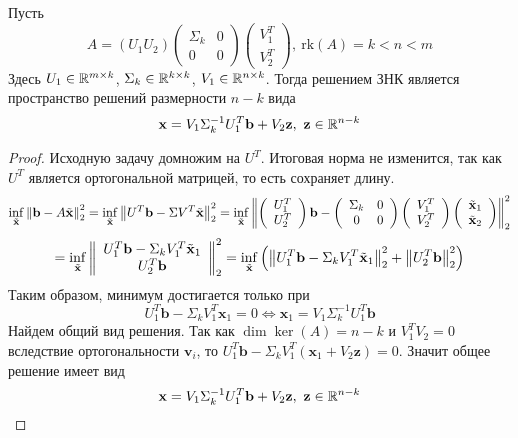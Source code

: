 \begin{theorem}
  Пусть
  \[A=(U_1U_2)\left(\begin{array}{cc}
        \Sigma_k & 0 \\
        0        & 0
      \end{array}\right)
    \left(\begin{array}{c}
        V_1^T \\
        V_2^T
      \end{array}\right),\ \text{rk}(A)=k<n<m\]
  Здесь $U_1\in\mathbb{R}^{m\times k}$, $\Sigma_k\in\mathbb{R}^{k\times k}$, $V_1\in\mathbb{R}^{n\times k}$.
  Тогда решением ЗНК является пространство решений размерности $n-k$ вида
  \[\mathbf{x}=V_1\Sigma_k^{-1}U_1^T\mathbf{b}+V_2\mathbf{z},\ \mathbf{z}\in\R^{n-k}\]
\end{theorem}
\begin{proof}
  Исходную задачу домножим на $U^T$. Итоговая норма
  не изменится, так как $U^T$ является ортогональной матрицей, то есть сохраняет длину.
  \[\inf_{\tilde{\mathbf{x}}}\left\lVert\mathbf{b}-A\tilde{\mathbf{x}}\right\rVert_2^2
    =\inf_{\tilde{\mathbf{x}}}\left\lVert U^T\mathbf{b}-\Sigma V^T\tilde{\mathbf{x}}\right\rVert_2^2
    =\inf_{\tilde{\mathbf{x}}}\left\lVert
      \left(\begin{array}{c}
          U_1^T \\
          U_2^T\end{array}\right)
      \mathbf{b}-\left(\begin{array}{cc}
          \Sigma_{k} & 0 \\
          0          & 0\end{array}\right)
      \left(\begin{array}{c}
          V_1^T \\
          V_2^T
        \end{array}\right)
      \left(\begin{array}{c}
          \tilde{\mathbf{x}}_1 \\
          \tilde{\mathbf{x}}_2\end{array}\right)
    \right\rVert_2^2\]
  \[=\inf_{\tilde{\mathbf{x}}}\left\lVert
      \begin{array}{c}
        U_1^T\mathbf{b}-\Sigma_k V_1^T\tilde{\mathbf{x}}_1 \\
        U_2^T\mathbf{b}\end{array}
    \right\rVert_2^2
    =\inf_{\tilde{\mathbf{x}}}\left(\left\lVert U_1^T\mathbf{b}-\Sigma_k V_1^T\tilde{\mathbf{x}}_1\right\rVert_2^2 + \left\lVert U_2^T\mathbf{b}\right\rVert^2_2\right)\]
  Таким образом, минимум достигается только при
  \[U_1^T\mathbf{b}-\Sigma_k V_1^T\mathbf{x}_1=0\Leftrightarrow\mathbf{x}_1=V_1\Sigma_k^{-1}U_1^T\mathbf{b}\]
  Найдем общий вид решения. Так как $\dim\ker(A)=n-k$ и $V_1^TV_2=0$ вследствие ортогональности $\mathbf{v}_i$,
  то $U_1^T\mathbf{b}-\Sigma_k V_1^T(\mathbf{x}_1+V_2\mathbf{z})=0$. Значит общее решение имеет вид
  \[\mathbf{x}=V_1\Sigma_k^{-1}U_1^T\mathbf{b}+V_2\mathbf{z},\ \mathbf{z}\in\R^{n-k}\]
\end{proof}
